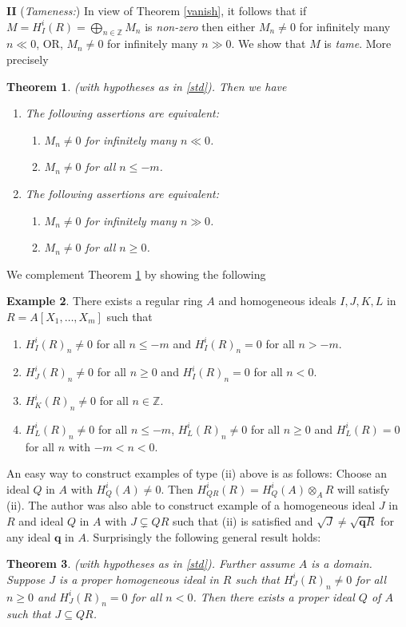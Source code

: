 \documentclass{amsart}
\newcommand{\ZZ}{\mathbb{Z} }
\theoremstyle{plain}
\newtheorem{theorem}{Theorem}[section]
\theoremstyle{definition}
\newtheorem{example}[theorem]{Example}
\theoremstyle{remark}
\begin{document}
\textbf{II} (\textit{Tameness:}) In view of Theorem \ref{vanish}, it follows that if
$M = H^i_I(R) = \bigoplus_{n \in \ZZ}M_n $ is \emph{non-zero} then either $M_n \neq 0$ for infinitely  many $n \ll 0$, OR, $M_n \neq 0$ for infinitely  many $n \gg 0$. We show that $M$ is \emph{tame}. More precisely 
\begin{theorem}\label{tame}
(with hypotheses as in \ref{std}).  Then we have
\begin{enumerate}[\rm (a)]
\item
The following assertions are equivalent:
\begin{enumerate}[\rm(i)]
\item
$M_n \neq 0$ for infinitely many $n \ll 0$.
\item
$M_n \neq 0$ for all $n \leq -m$.
\end{enumerate}
\item
The following assertions are equivalent:
\begin{enumerate}[\rm(i)]
\item
$M_n \neq 0$ for infinitely many $n \gg 0$.
\item
$M_n \neq 0$ for all $n \geq 0$.
\end{enumerate}
\end{enumerate}
\end{theorem}
We complement Theorem \ref{tame} by showing the following
\begin{example}\label{ex-tame} There exists a regular ring $A$ and homogeneous ideals $I, J, K, L$ in $R = A[X_1,\ldots, X_m]$ such that
\begin{enumerate}[\rm (i)]
\item
$H^i_I(R)_n \neq 0$ for all $n \leq -m$ and $H^i_I(R)_n = 0$ for all $n > - m$.
\item
$H^i_J(R)_n \neq 0$ for all $n \geq 0$ and $H^i_I(R)_n = 0$ for all $n < 0$.
\item
$H^i_K(R)_n \neq 0$ for all $n \in \ZZ$.
\item
$H^i_L(R)_n \neq 0$ for all $n \leq -m$, $H^i_L(R)_n \neq 0$ for all $n \geq 0$ and $H^i_L(R) = 0$ for all $n$ with $-m < n < 0$.
\end{enumerate}
\end{example}

An easy way to construct examples of type (ii) above is as follows: Choose an ideal $Q$ in $A$ with $H^i_Q(A) \neq 0$. Then $H^i_{QR}(R) = H^i_Q(A)\otimes_A R$
will satisfy (ii). 
The author was also able to construct example of a homogeneous ideal $J$ in $R$ and ideal $Q$ in $A$ with $J \varsubsetneq  QR$ such that (ii) is satisfied and $\sqrt{J} \neq \sqrt{\mathbf{q}R}$ for any ideal $\mathbf{q}$ in $A$. Surprisingly the following general result holds:
\begin{theorem}\label{type2}
(with hypotheses as in \ref{std}). Further assume $A$ is a domain.
Suppose $J$ is a proper homogeneous ideal in $R$ such that $H^i_J(R)_n \neq 0$ for all $n \geq 0$ and $H^i_J(R)_n = 0$ for all $n < 0$. Then there exists a proper ideal $Q$ of $A$ such that $J \subseteq QR$.
\end{theorem}
\end{document}
